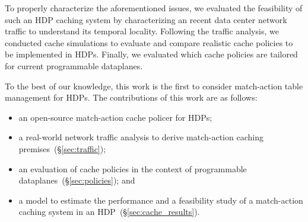 To properly characterize the aforementioned issues, we evaluated the feasibility of such an HDP caching system by characterizing an recent data center network traffic to understand its temporal locality.
Following the traffic analysis, we conducted cache simulations to evaluate and compare realistic cache policies to be implemented in HDPs.
Finally, we evaluated which cache policies are tailored for current programmable dataplanes.%

To the best of our knowledge, this work is the first to consider match-action table management for HDPs.
The contributions of this work are as follows: 

\begin{itemize}[noitemsep,topsep=0pt]
	\item an open-source match-action cache policer for HDPs;
	\item a real-world network traffic analysis to derive match-action caching premises~(\S\ref{sec:traffic});
	\item an evaluation of cache policies in the context of programmable dataplanes~(\S\ref{sec:policies}); and
	\item a model to estimate the performance and a feasibility study of a match-action caching system in an HDP~(\S\ref{sec:cache_results}).
\end{itemize}


